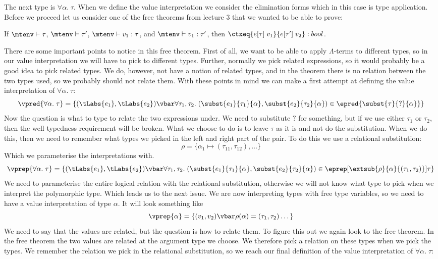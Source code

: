 The next type is $\forall \alpha. \; \tau$. When we define the value interpretation we consider the elimination forms which in this case is type application. Before we proceed let us consider one of the free theorems from lecture 3 that we wanted to be able to prove:
\begin{theorem}
  If $\mtenv \vdash \tau$, 
  $\mtenv \vdash \tau'$, 
  $\mtenv \vdash v_1 : \tau$, 
  and $\mtenv \vdash v_1 : \tau'$, 
  then $\ctxeq{e[\tau]\; v_1}{e[\tau']\; v_2} : bool$.
\end{theorem}
There are some important points to notice in this free theorem. First of all, we want to be able to apply $\Lambda$-terms to different types, so in our value interpretation we will have to pick to different types. Further, normally we pick related expressions, so it would probably be a good idea to pick related types. We do, however, not have a notion of related types, and in the theorem there is no relation between the two types used, so we probably should not relate them. With these points in mind we can make a first attempt at defining the value interpretation of $\forall \alpha. \; \tau$:
\[
  \vpred{\forall \alpha. \; \tau} = \{(\tLabs{e_1}, \tLabs{e_2}) \vbar \forall \tau_1,\tau_2. \; (\subst{e_1}{\tau_1}{\alpha},\subst{e_2}{\tau_2}{\alpha}) \in \epred{\subst{\tau}{?}{\alpha}} \}
  \]
Now the question is what to type to relate the two expressions under. We need to substitute $?$ for something, but if we use either $\tau_1$ or $\tau_2$, then the well-typedness requirement will be broken. What we choose to do is to leave $\tau$ as it is and not do the substitution. When we do this, then we need to remember what types we picked in the left and right part of the pair. To do this we use a relational substitution:
\[
  \rho = \{ \alpha_1 \mapsto (\tau_{11},\tau_{12} ), \dots \}
\]
Which we parameterise the interpretations with.
\[
  \vprep{\forall \alpha.\; \tau} = \{(\tLabs{e_1},\tLabs{e_2}) \vbar \forall \tau_1 , \tau_2. \; (\subst{e_1}{\tau_1}{\alpha},\subst{e_2}{\tau_2}{\alpha}) \in \eprep[\extsub{\rho}{\alpha}{(\tau_1,\tau_2)}]{\tau} \}
\]
We need to parameterise the entire logical relation with the relational substitution, otherwise we will not know what type to pick when we interpret the polymorphic type. Which leads us to the next issue. We are now interpreting types with free type variables, so we need to have a value interpretation of type $\alpha$. It will look something like
\[
\vprep{\alpha} = \{(v_1,v_2) \vbar \rho(\alpha) = (\tau_1,\tau_2) \dots\}
\]
We need to say that the values are related, but the question is how to relate them. To figure this out we again look to the free theorem. In the free theorem the two values are related at the argument type we choose. We therefore pick a relation on these types when we pick the types. We remember the relation we pick in the relational substitution, so we reach our final definition of the value interpretation of $\forall \alpha. \; \tau$:
